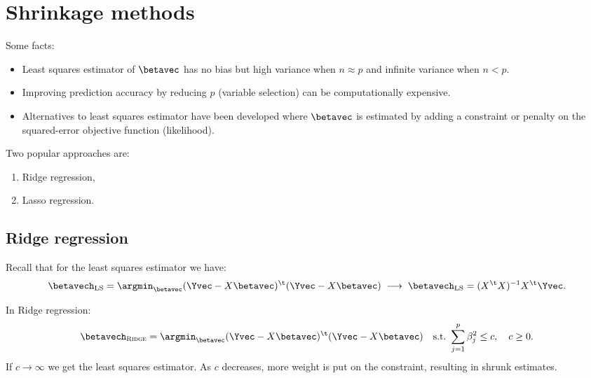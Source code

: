 \section{Shrinkage methods}

Some facts:
\begin{itemize}
    \item Least squares estimator of $\betavec$ has no bias but high variance when $n \approx p$ and infinite variance when $n < p$.
    \item Improving prediction accuracy by reducing $p$ (variable selection) can be computationally expensive.
    \item Alternatives to least squares estimator have been developed where $\betavec$ is estimated by adding a constraint or penalty on the squared-error objective function (likelihood).
\end{itemize}

Two popular approaches are:
\begin{enumerate}[beginpenalty=10000]
    \item Ridge regression,
    \item Lasso regression.
\end{enumerate}
\subsection{Ridge regression}

Recall that for the least squares estimator we have:
\begin{equation}
    \betavech_{\text{LS}} = \argmin_{\betavec} {(\Yvec - X\betavec)^\t (\Yvec - X\betavec)}\;\longrightarrow\;\betavech_{\text{LS}} = (X^\t X)^{-1} X^\t \Yvec.
\end{equation}

In Ridge regression:
\begin{equation}
    \betavech_{\textsc{Ridge}} = \argmin_{\betavec} {(\Yvec - X\betavec)^\t (\Yvec - X\betavec)}\quad \text{s.t.\@ } \sum_{j=1}^p \beta_j^2 \leq c, \quad c \geq 0.
\end{equation}
If $c \to \infty$ we get the least squares estimator. As $c$ decreases, more weight is put on the constraint, resulting in shrunk estimates.

